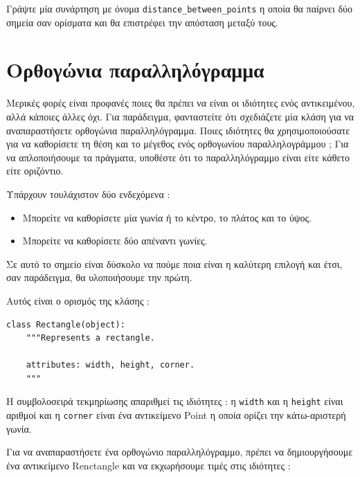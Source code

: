 \documentclass[10pt]{book}
\begin{document}
\begin{exercise}

Γράψτε μία συνάρτηση με όνομα  \verb"distance_between_points"  η οποία θα παίρνει δύο σημεία σαν ορίσματα 
και θα επιστρέφει την απόσταση μεταξύ τους.
\end{exercise}



\section{Ορθογώνια παραλληλόγραμμα}
\label{rectangles}

Μερικές φορές είναι προφανές ποιες θα πρέπει να είναι οι ιδιότητες ενός αντικειμένου, αλλά κάποιες άλλες όχι. 
Για παράδειγμα, φανταστείτε ότι σχεδιάζετε μία κλάση για να αναπαραστήσετε ορθογώνια παραλληλόγραμμα. Ποιες ιδιότητες 
θα χρησιμοποιούσατε για να καθορίσετε τη θέση και το μέγεθος ενός ορθογωνίου παραλληλογράμμου ;    Για να απλοποιήσουμε τα πράγματα, υποθέστε ότι το παραλληλόγραμμο είναι είτε κάθετο είτε οριζόντιο.

Υπάρχουν τουλάχιστον δύο ενδεχόμενα :

\begin{itemize}

\item  Μπορείτε να καθορίσετε μία γωνία ή το κέντρο, το πλάτος και το ύψος.

 \item  Μπορείτε να καθορίσετε δύο απέναντι γωνίες.  

\end{itemize}

 Σε αυτό το σημείο είναι δύσκολο να πούμε ποια είναι η καλύτερη επιλογή και έτσι, σαν παράδειγμα, θα υλοποιήσουμε την πρώτη.

Αυτός είναι ο ορισμός της κλάσης :

\begin{verbatim}
class Rectangle(object):
    """Represents a rectangle.

    attributes: width, height, corner.
    """
\end{verbatim}
%
 Η συμβολοσειρά τεκμηρίωσης απαριθμεί τις ιδιότητες :  η  {\tt width}  και η  {\tt height}  είναι αριθμοί και  η  {\tt corner}  είναι ένα αντικείμενο  Point  η οποία ορίζει την κάτω-αριστερή γωνία.

Για να αναπαραστήσετε ένα ορθογώνιο παραλληλόγραμμο, πρέπει να δημιουργήσουμε ένα αντικείμενο  Renctangle  και να 
εκχωρήσουμε τιμές στις ιδιότητες :
\end{document}
